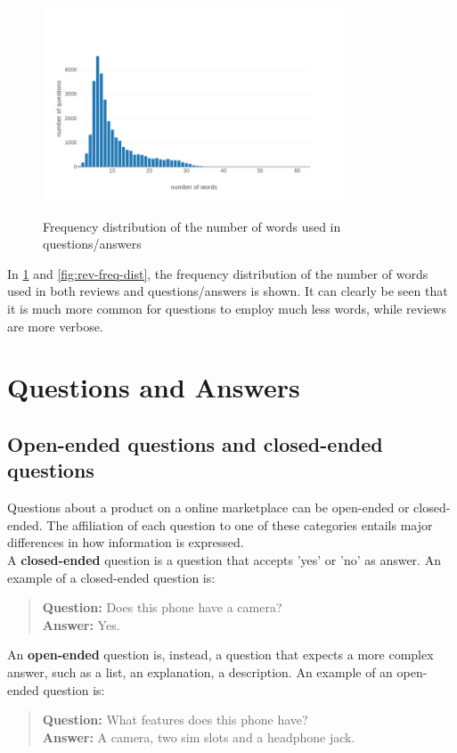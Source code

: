 \documentclass[LaM,oneside,binding=0.6cm]{sapthesis}
\begin{document}
\begin{figure}
\centering
\includegraphics[width=0.8\textwidth]{pictures/quest_freq_dist.png}\\[3ex]
\caption{Frequency distribution of the number of words used in questions/answers}
\label{fig:quest-freq-dist}
\end{figure}

In \ref{fig:quest-freq-dist} and \ref{fig:rev-freq-dist}, the frequency distribution of the number of words used in both reviews and questions/answers is shown. It can clearly be seen that it is much more common for questions to employ much less words, while reviews are more verbose.

\section{Questions and Answers}

\subsection{Open-ended questions and closed-ended questions}

Questions about a product on a online marketplace can be open-ended or closed-ended. The affiliation of each question to one of these categories entails major differences in how information is expressed. \\

A \textbf{closed-ended} question is a question that accepts 'yes' or 'no' as answer. An example of a closed-ended question is:
\begin{quote}
\textbf{Question:} Does this phone have a camera? \\
\textbf{Answer:} Yes.
\end{quote} 

An \textbf{open-ended} question is, instead, a question that expects a more complex answer, such as a list, an explanation, a description. An example of an open-ended question is:
\begin{quote}
\textbf{Question:} What features does this phone have? \\
\textbf{Answer:} A camera, two sim slots and a headphone jack.
\end{quote}
\end{document}
